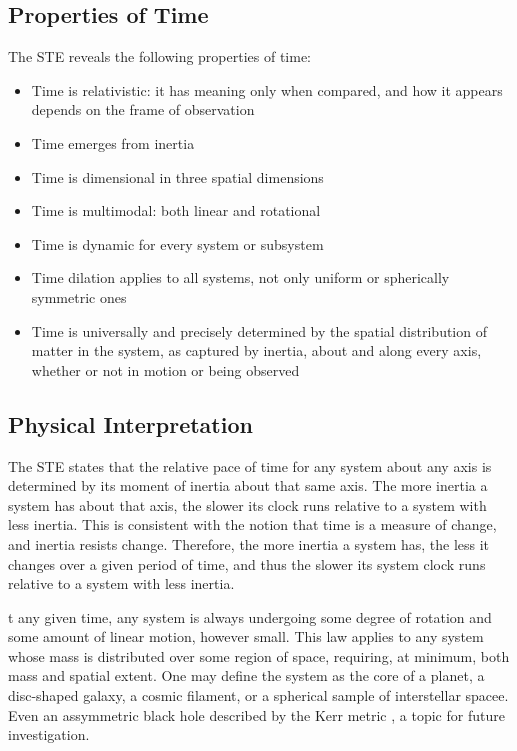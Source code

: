 \subsection{Properties of Time}
The STE reveals the following properties of time:
\begin{itemize}
\item Time is relativistic: it has meaning only when compared, and how it appears depends on the frame of observation
\item Time emerges from inertia
\item Time is dimensional in three spatial dimensions
\item Time is multimodal: both linear and rotational
\item Time is dynamic for every system or subsystem
\item Time dilation applies to all systems, not only uniform or spherically symmetric ones
\item Time is universally and precisely determined by the spatial distribution of matter in the system, as captured by inertia, about and along every axis, whether or not in motion or being observed
\end{itemize}

\subsection{Physical Interpretation}
The STE states that the relative pace of time for any system about any axis is determined by its moment of inertia about that same axis. The more inertia a system has about that axis, the slower its clock runs relative to a system with less inertia. This is consistent with the notion that time is a measure of change, and inertia resists change. Therefore, the more inertia a system has, the less it changes over a given period of time, and thus the slower its system clock runs relative to a system with less inertia.

t any given time, any system is always undergoing some degree of rotation and some amount of linear motion, however small. This law applies to any system whose mass is distributed over some region of space, requiring, at minimum, both mass and spatial extent. One may define the system as the core of a planet, a disc-shaped galaxy, a cosmic filament, or a spherical sample of interstellar spacee. Even an assymmetric black hole described by the Kerr metric \citep{kerr1963}, a topic for future investigation.


